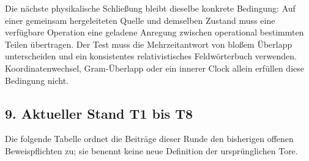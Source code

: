 Die nächste physikalische Schließung bleibt dieselbe konkrete Bedingung:
Auf einer gemeinsam hergeleiteten Quelle und demselben Zustand muss eine
verfügbare Operation eine geladene Anregung zwischen operational
bestimmten Teilen übertragen. Der Test muss die Mehrzeitantwort von
bloßem Überlapp unterscheiden und ein konsistentes relativistisches
Feldwörterbuch verwenden. Koordinatenwechsel, Gram-Überlapp oder ein
innerer Clock allein erfüllen diese Bedingung nicht.

\subsection{9. Aktueller Stand T1 bis
T8}\label{aktueller-stand-t1-bis-t8}

Die folgende Tabelle ordnet die Beiträge dieser Runde den bisherigen
offenen Beweispflichten zu; sie benennt keine neue Definition der
ursprünglichen Tore.

